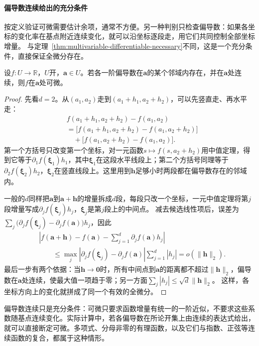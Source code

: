 \paragraph{偏导数连续给出的充分条件}
按定义验证可微需要估计余项，通常不方便。另一种判别只检查偏导数：如果各坐标的变化率在基点附近连续变化，就可以沿坐标逐段走，用它们共同控制全部坐标增量。
与定理~\ref{thm:multivariable-differentiable-necessary}不同，这是一个充分条件，直接保证全微分存在。
\begin{theorem}[偏导数连续与可微性]
\label{thm:multivariable-continuous-partials-sufficient}
设$f:U\to\mathbb R$，$U$开，$\bm a\in U$。若各一阶偏导数在$\bm a$的某个邻域内存在，并在$\bm a$处连续，则$f$在$\bm a$处可微。
\end{theorem}
\begin{proof}
先看$d=2$。从$(a_1,a_2)$走到$(a_1+h_1,a_2+h_2)$，可以先竖直走、再水平走：
\[
 \begin{aligned}
 &f(a_1+h_1,a_2+h_2)-f(a_1,a_2)\\
 &=\bigl[f(a_1+h_1,a_2+h_2)-f(a_1,a_2+h_2)\bigr]\\
 &\quad+\bigl[f(a_1,a_2+h_2)-f(a_1,a_2)\bigr].
 \end{aligned}
\]
第一个方括号只改变第一个坐标，对一元函数$s\mapsto f(s,a_2+h_2)$用中值定理，得到它等于$\partial_1f(\bm\xi_1)h_1$，其中$\bm\xi_1$在这段水平线段上；第二个方括号同理等于$\partial_2f(\bm\xi_2)h_2$，$\bm\xi_2$在竖直线段上。这里用到$\bm h$足够小时两段都在偏导数存在的邻域内。

一般的$d$同样把$\bm a$到$\bm a+\bm h$的增量拆成$d$段，每段只改一个坐标，一元中值定理将第$j$段增量写成$\partial_jf(\bm\xi_j)h_j$，$\bm\xi_j$是第$j$段上的中间点。
减去候选线性项后，误差为$\sum_j\bigl(\partial_jf(\bm\xi_j)-\partial_jf(\bm a)\bigr)h_j$，因此
\[
 \begin{aligned}
 &\left|f(\bm a+\bm h)-f(\bm a)-\sum_{j=1}^d\partial_j f(\bm a)h_j\right|\\
 &\qquad\leq \max_j\left|\partial_j f(\bm\xi_j)-\partial_j f(\bm a)\right|
       \sum_{j=1}^d|h_j|
 =o(\lVert\bm h\rVert_2).
 \end{aligned}
\]
最后一步有两个依据：当$\bm h\to\bm0$时，所有中间点到$\bm a$的距离都不超过$\lVert\bm h\rVert_2$，偏导数在$\bm a$处连续，使最大值一项趋于零；另一方面$\sum_j|h_j|\leq\sqrt d\lVert\bm h\rVert_2$。
这样，各坐标方向上的变化就拼成了同一个有效的全微分。
\end{proof}
偏导数连续只是充分条件：可微只要求函数增量有统一的一阶近似，不要求这些系数随基点连续变化。实际计算中，若各偏导数在所论开集上由连续的表达式给出，就可以直接断定可微。多项式、分母非零的有理函数，以及它们与指数、正弦等连续函数的复合，都属于这种情形。

